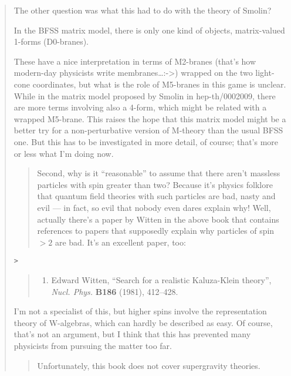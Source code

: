 \documentclass{article}
\def\tightlist{}
\begin{document}
\begin{quote}
The other question was what this had to do with the theory of Smolin?

In the BFSS matrix model, there is only one kind of objects,
matrix-valued 1-forms (D0-branes).

These have a nice interpretation in terms of M2-branes (that's how
modern-day physicists write membranes\ldots:-\textgreater) wrapped on
the two light-cone coordinates, but what is the role of M5-branes in
this game is unclear. While in the matrix model proposed by Smolin in
hep-th/0002009, there are more terms involving also a 4-form, which
might be related with a wrapped M5-brane. This raises the hope that this
matrix model might be a better try for a non-perturbative version of
M-theory than the usual BFSS one. But this has to be investigated in
more detail, of course; that's more or less what I'm doing now.

\begin{quote}
Second, why is it ``reasonable'' to assume that there aren't massless
particles with spin greater than two? Because it's physics folklore that
quantum field theories with such particles are bad, nasty and evil ---
in fact, so evil that nobody even dares explain why! Well, actually
there's a paper by Witten in the above book that contains references to
papers that supposedly explain why particles of spin \(> 2\) are bad.
It's an excellent paper, too:
\end{quote}

\begin{verbatim}
>
\end{verbatim}

\begin{quote}
\begin{enumerate}
\def\labelenumi{\arabic{enumi})}
\setcounter{enumi}{1}
\tightlist
\item
  Edward Witten, ``Search for a realistic Kaluza-Klein theory'',
  \emph{Nucl. Phys.} \textbf{B186} (1981), 412--428.
\end{enumerate}
\end{quote}

I'm not a specialist of this, but higher spins involve the
representation theory of W-algebras, which can hardly be described as
easy. Of course, that's not an argument, but I think that this has
prevented many physicists from pursuing the matter too far.

\begin{quote}
Unfortunately, this book does not cover supergravity theories.
\end{quote}


\end{quote}
\end{document}
